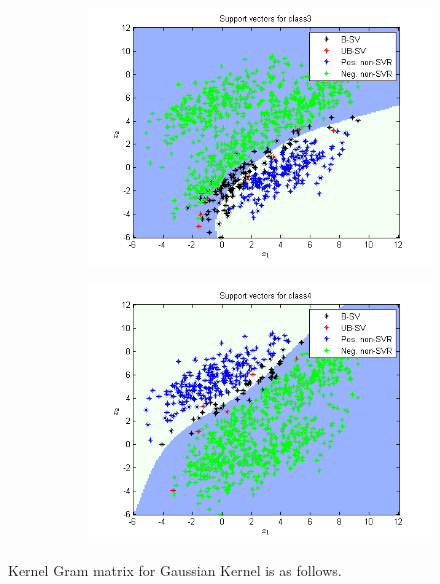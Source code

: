 \documentclass{article}
\begin{document}
\begin{figure}
\begin{subfigure}{.5\textwidth}
  \centering
  \includegraphics[width=.8\linewidth]{Classification/1c/c_g/sv3}
 
\end{subfigure}%
\begin{subfigure}{.5\textwidth}
  \centering
  \includegraphics[width=.8\linewidth]{Classification/1c/c_g/sv4}
  
\end{subfigure}
\end{figure}
Kernel Gram matrix for Gaussian Kernel is as follows.
\end{document}
